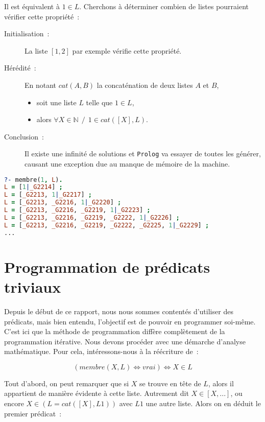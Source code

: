 Il est équivalent à $1 \in L$. Cherchons à déterminer combien de listes
pourraient vérifier cette propriété~:

\pagebreak

\begin{description}
\item[Initialisation~:]{La liste $[1, 2]$ par exemple vérifie cette propriété.}
\item[Hérédité~:]
{
	En notant $cat(A, B)$ la concaténation de deux listes $A$ et $B$,
		\begin{itemize}
			\item soit une liste $L$ telle que $1 \in L$,
			\item alors $\forall X \in \mathbb{N}~~/~~1 \in cat([X], L)$.
		\end{itemize}
}

\item[Conclusion~:]{Il existe une infinité de solutions et \texttt{Prolog} va essayer
de toutes les générer, causant une exception due au manque de mémoire de la machine.}
\end{description}

\begin{lstlisting}[language=Prolog,frame=single]
?- membre(1, L).
L = [1|_G2214] ;
L = [_G2213, 1|_G2217] ;
L = [_G2213, _G2216, 1|_G2220] ;
L = [_G2213, _G2216, _G2219, 1|_G2223] ;
L = [_G2213, _G2216, _G2219, _G2222, 1|_G2226] ;
L = [_G2213, _G2216, _G2219, _G2222, _G2225, 1|_G2229] ;
...
\end{lstlisting}


\section{Programmation de prédicats triviaux}

Depuis le début de ce rapport, nous nous sommes contentés d'utiliser des prédicats, mais bien entendu,
l'objectif est de pouvoir en programmer soi-même. C'est ici que la méthode de programmation diffère
complètement de la programmation itérative. Nous devons procéder avec une démarche
d'analyse mathématique. Pour cela, intéressons-nous à la réécriture de~:

\[
	(membre(X, L) \Leftrightarrow vrai) \Leftrightarrow X \in L
\]

Tout d'abord, on peut remarquer que si $X$ se trouve en tête de $L$, alors il appartient de manière évidente à cette liste. Autrement dit $X \in [X, ...]$, ou encore
$X \in (L = cat([X], L1))$ avec $L1$ une autre liste. Alors on en déduit le premier prédicat~:

